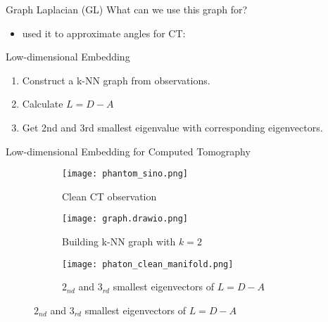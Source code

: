 \begin{frame}{Graph Laplacian (GL)}
  What can we use this graph for?
  \pause
  \begin{itemize}
  \item \cite{LaplaceRandomProjections} used it to approximate angles for CT:
\end{itemize}

\pause

\begin{block}{Low-dimensional Embedding}
  \begin{enumerate}
    \item Construct a k-NN graph from observations.
    \item Calculate $L = D - A $
    \item Get 2nd and 3rd smallest eigenvalue with corresponding eigenvectors.
  \end{enumerate}
\end{block}

\end{frame}


\begin{frame}{Low-dimensional Embedding for Computed Tomography}
  \begin{figure}
    \centering
    \begin{subfigure}[t]{0.3\textwidth}
        \texttt{[image: phantom\_sino.png]}
        \caption{Clean CT observation}
    \end{subfigure} \hfill
    \pause
    \begin{subfigure}[t]{0.3\textwidth}
        \texttt{[image: graph.drawio.png]}
        \caption{Building k-NN graph with $ k = 2$ }
    \end{subfigure}\hfill
    \pause
    \begin{subfigure}[t]{0.3\textwidth}
      \texttt{[image: phaton\_clean\_manifold.png]}
      \caption{$2_{nd}$ and $3_{rd}$ smallest eigenvectors of  $L =  D - A$}
  \end{subfigure}
\end{figure}
  
\end{frame}


